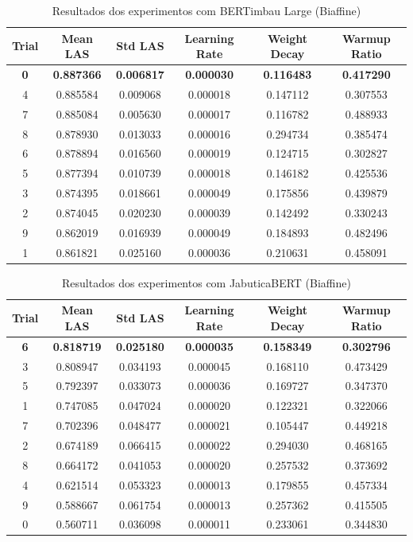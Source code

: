 \begin{table}[ht]
\centering
\caption{Resultados dos experimentos com BERTimbau Large (Biaffine)}
\label{tab:bertimbau-large-results}
\begin{tabular}{c c c c c c}
\hline
\textbf{Trial} & \textbf{Mean LAS} & \textbf{Std LAS} & \textbf{Learning Rate} & \textbf{Weight Decay} & \textbf{Warmup Ratio} \\
\hline
\textbf{0} & \textbf{0.887366} & \textbf{0.006817} & \textbf{0.000030} & \textbf{0.116483} & \textbf{0.417290} \\
4 & 0.885584 & 0.009068 & 0.000018 & 0.147112 & 0.307553 \\
7 & 0.885084 & 0.005630 & 0.000017 & 0.116782 & 0.488933 \\
8 & 0.878930 & 0.013033 & 0.000016 & 0.294734 & 0.385474 \\
6 & 0.878894 & 0.016560 & 0.000019 & 0.124715 & 0.302827 \\
5 & 0.877394 & 0.010739 & 0.000018 & 0.146182 & 0.425536 \\
3 & 0.874395 & 0.018661 & 0.000049 & 0.175856 & 0.439879 \\
2 & 0.874045 & 0.020230 & 0.000039 & 0.142492 & 0.330243 \\
9 & 0.862019 & 0.016939 & 0.000049 & 0.184893 & 0.482496 \\
1 & 0.861821 & 0.025160 & 0.000036 & 0.210631 & 0.458091 \\
\hline
\end{tabular}
\end{table}


\begin{table}[ht]
\centering
\caption{Resultados dos experimentos com JabuticaBERT (Biaffine)}
\label{tab:bertimbau-large-results}
\begin{tabular}{c c c c c c}
\hline
\textbf{Trial} & \textbf{Mean LAS} & \textbf{Std LAS} & \textbf{Learning Rate} & \textbf{Weight Decay} & \textbf{Warmup Ratio} \\
\hline
\textbf{6} & \textbf{0.818719} & \textbf{0.025180} & \textbf{0.000035} & \textbf{0.158349} & \textbf{0.302796} \\
3 & 0.808947 & 0.034193 & 0.000045 & 0.168110 & 0.473429 \\
5 & 0.792397 & 0.033073 & 0.000036 & 0.169727 & 0.347370 \\
1 & 0.747085 & 0.047024 & 0.000020 & 0.122321 & 0.322066 \\
7 & 0.702396 & 0.048477 & 0.000021 & 0.105447 & 0.449218 \\
2 & 0.674189 & 0.066415 & 0.000022 & 0.294030 & 0.468165 \\
8 & 0.664172 & 0.041053 & 0.000020 & 0.257532 & 0.373692 \\
4 & 0.621514 & 0.053323 & 0.000013 & 0.179855 & 0.457334 \\
9 & 0.588667 & 0.061754 & 0.000013 & 0.257362 & 0.415505 \\
0 & 0.560711 & 0.036098 & 0.000011 & 0.233061 & 0.344830 \\
\hline
\end{tabular}
\end{table}

